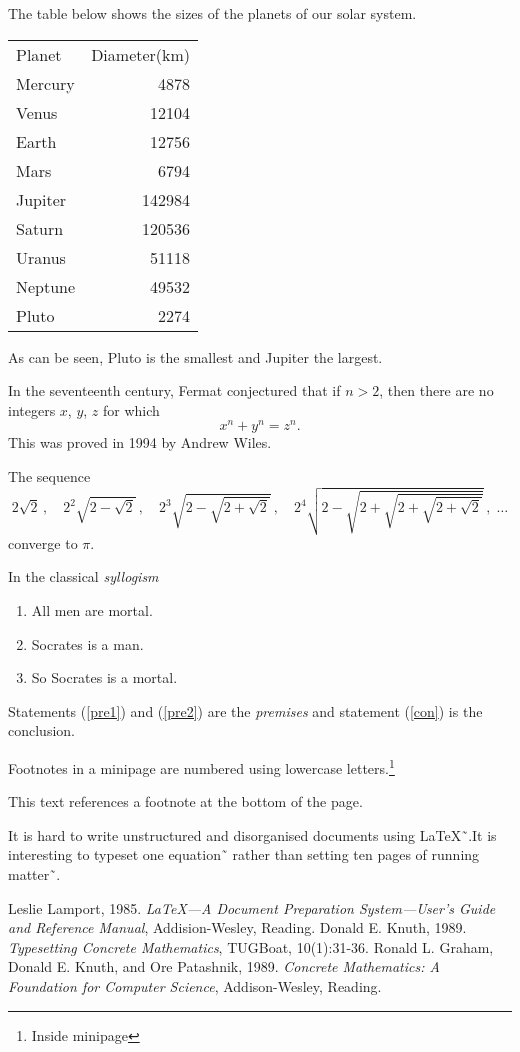 \documentclass{book}
\begin{document}
The table below shows the sizes of the planets of our solar system.
\begin{center}
\begin{tabular}{lr}
Planet & Diameter(km)\\[5pt]
Mercury & 4878\\
Venus & 12104\\
Earth & 12756\\
Mars & 6794\\
Jupiter & 142984\\
Saturn & 120536\\
Uranus & 51118\\
Neptune & 49532\\
Pluto & 2274
\end{tabular}
\end{center}
As can be seen, Pluto is the smallest and Jupiter the largest.

In the seventeenth century, Fermat conjectured that if $n>2$, then
there are no integers $x$, $y$, $z$ for which
$$
x^n+y^n=z^n.
$$
This was proved in 1994 by Andrew Wiles.

The sequence
$$
2\sqrt{2}\,,\quad 2^2\sqrt{2-\sqrt{2}}\,,\quad 2^3
\sqrt{2-\sqrt{2+\sqrt{2}}}\,,\quad 2^4\sqrt{2-
\sqrt{2+\sqrt{2+\sqrt{2+\sqrt{2}}}}}\,,\;\ldots
$$
converge to $\pi$.

In the classical \emph{syllogism}
\begin{enumerate}
\item All men are mortal.\label{pre1}
\item Socrates is a man.\label{pre2}
\item So Socrates is a mortal.\label{con}
\end{enumerate}
Statements (\ref{pre1}) and (\ref{pre2}) are the \emph{premises} and
statement (\ref{con}) is the conclusion.

\begin{minipage}{5cm}
Footnotes in a minipage are numbered
using lowercase letters.\footnote{%
Inside minipage} \par This text
references a footnote at the bottom
of the page.\footnotemark
\end{minipage}

It is hard to write unstructured and disorganised documents using
\LaTeX˜\cite{les85}.It is interesting to typeset one
equation˜\cite[Sec 3.3]{les85} rather than setting ten pages of
running matter˜\cite{don89,rondon89}.
\begin{thebibliography}{9}
Leslie Lamport, 1985. \emph{\LaTeX---A Document
Preparation System---User’s Guide and Reference Manual},
Addision-Wesley, Reading.
Donald E. Knuth, 1989. \emph{Typesetting Concrete
Mathematics}, TUGBoat, 10(1):31-36.
Ronald L. Graham, Donald E. Knuth, and Ore
Patashnik, 1989. \emph{Concrete Mathematics: A Foundation for
Computer Science}, Addison-Wesley, Reading.
\end{thebibliography}
\end{document}
